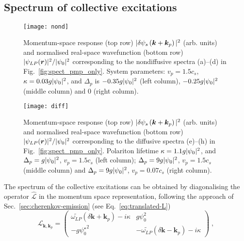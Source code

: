 \subsection{Spectrum of collective excitations}
\label{sec:spect}
%
\begin{figure}[tb]\centering
  \texttt{[image: nond]}
  \caption{
    Momentum-space response (top row) $\vert \delta \psi_s\left(\bm{k} +
        \bm{k}_p \right) \vert^2$ (arb. units) and normalised real-space
    wavefunction (bottom row) $\vert \psi_{LP}(\bm{r}) \vert^2/\vert \psi_0 \vert^2$
    corresponding to the nondiffusive spectra (a)--(d) in
    Fig.~\ref{fig:spect_pmp_only}. System parameters: $v_p = 1.5 c_s$,
    $\kappa = 0.03 g\vert \psi_0 \vert^2$, and $\Delta_p$ is $-0.35
    g\vert \psi_0 \vert^2$ (left column), $-0.25 g\vert \psi_0 \vert^2$ (middle
    column) and 0 (right column).
  }\label{fig:nondiffusive}
\end{figure}
%
\begin{figure}[tb]\centering
  \texttt{[image: diff]}
  \caption{
    Momentum-space response (top row) $\vert \delta \psi_s\left(\bm{k} +
        \bm{k}_p \right) \vert^2$ (arb. units) and normalised real-space
    wavefunction (bottom row) $\vert \psi_{LP}(\bm{r}) \vert^2/\vert \psi_0 \vert^2$
    corresponding to the diffusive spectra (e)--(h) in
    Fig.~\ref{fig:spect_pmp_only}. Polariton lifetime $\kappa = 1.1
    g\vert \psi_0 \vert^2$, and $\Delta_p = g\vert \psi_0 \vert^2$, $v_p = 1.5 c_s$
    (left column); $\Delta_p = 9 g\vert \psi_0 \vert^2$, $v_p = 1.5 c_s$ (middle
    column) and $\Delta_p = 9 g\vert \psi_0 \vert^2$, $v_p = 0.07 c_s$ (right
    column).
  }\label{fig:diffusive}
\end{figure}
%
The spectrum of the collective excitations can be obtained by
diagonalising the operator $\hat{\mathcal{L}}$ in the momentum space
representation, following the approach of
Sec.~\ref{sec:cherenkov-emission} (see Eq.~\eqref{eq:translated-L})
%
\begin{equation}
  \mathcal{L}_{\bm{k},\bm{k}_p} = \begin{pmatrix}
    \widetilde{\omega_{LP}} (\delta \bm{k}+\bm{k}_p) - i \kappa &
    g \psi_0^2 \\ -g {\psi_0^{\star}}^2 & -
    \widetilde{\omega_{LP}}(\delta \bm{k}-\bm{k}_p) -
    i\kappa \end{pmatrix}\; ,
\label{eq:opell}
\end{equation}
